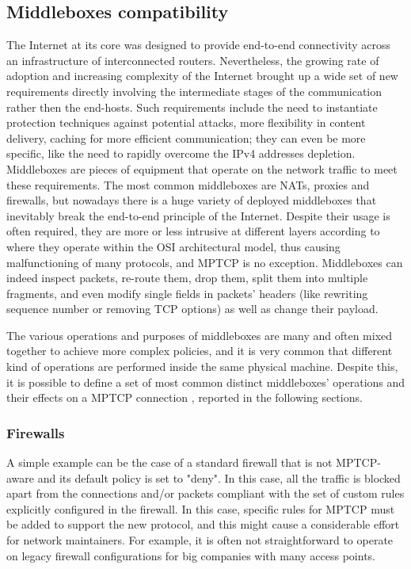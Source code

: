 \subsection{Middleboxes compatibility}
The Internet at its core was designed to provide end-to-end connectivity across an infrastructure of interconnected routers. Nevertheless, the growing rate of adoption and increasing complexity of the Internet brought up a wide set of new requirements directly involving the intermediate stages of the communication rather then the end-hosts. Such requirements include the need to instantiate protection techniques against potential attacks, more flexibility in content delivery, caching for more efficient communication; they can even be more specific, like the need to rapidly overcome the IPv4 addresses depletion. Middleboxes are pieces of equipment that operate on the network traffic to meet these requirements. The most common middleboxes are NATs, proxies and firewalls, but nowadays there is a huge variety of deployed middleboxes that inevitably break the end-to-end principle of the Internet. Despite their usage is often required, they are more or less intrusive at different layers according to where they operate within the OSI architectural model, thus causing malfunctioning of many protocols, and MPTCP is no exception. Middleboxes can indeed inspect packets, re-route them, drop them, split them into multiple fragments, and even modify single fields in packets' headers (like rewriting sequence number or removing TCP options) as well as change their payload.

The various operations and purposes of middleboxes are many and often mixed together to achieve more complex policies, and it is very common that different kind of operations are performed inside the same physical machine. Despite this, it is possible to define a set of most common distinct middleboxes' operations and their effects on a MPTCP connection  \cite{HDPDB13} \cite{RPBFHDBH12} \cite{2014:2578508}, reported in the following sections.

\subsubsection{Firewalls}
A simple example can be the case of a standard firewall that is not MPTCP-aware and its default policy is set to "deny". In this case, all the traffic is blocked apart from the connections and/or packets compliant with the set of custom rules explicitly configured in the firewall. In this case, specific rules for MPTCP must be added to support the new protocol, and this might cause a considerable effort for network maintainers. For example, it is often not straightforward to operate on legacy firewall configurations for big companies with many access points.

